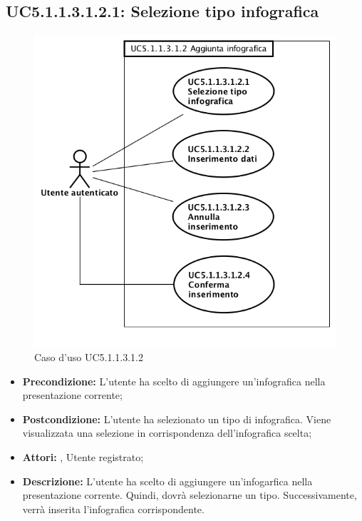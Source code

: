 \subsection{ UC5.1.1.3.1.2.1: Selezione tipo infografica}

\begin{figure}[h]
	\begin{center}
	\includegraphics[scale=0.4]{diagram/UC5-1-1-3-1-2.png}
	\caption{Caso d'uso UC5.1.1.3.1.2}
	\end{center}
\end{figure}
\begin{itemize}
	\item \textbf{Precondizione:} L'utente ha scelto di aggiungere un'infografica nella presentazione corrente;
	\item \textbf{Postcondizione:} L'utente ha selezionato un tipo di infografica. Viene visualizzata una selezione in corrispondenza dell'infografica scelta;
	\item \textbf{Attori:} , Utente registrato;
	\item \textbf{Descrizione:} L'utente ha scelto di aggiungere un'infogarfica nella presentazione corrente. Quindi, dovrà selezionarne un tipo. Successivamente, verrà inserita l'infografica corrispondente.
\end{itemize}
